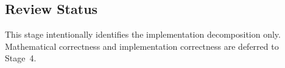 \subsection{Review Status}

This stage intentionally identifies the implementation decomposition
only. Mathematical correctness and implementation correctness are
deferred to Stage~4.
